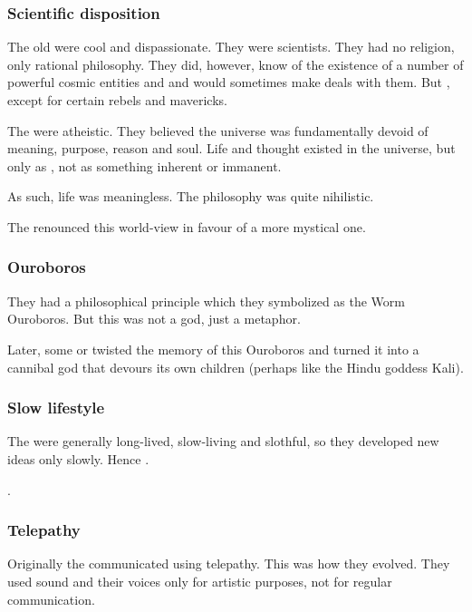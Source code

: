 \subsubsection{Scientific disposition}
The old \ophidians{} were cool and dispassionate. 
They were scientists. 
They had no religion, only rational philosophy. 
They did, however, know of the existence of a number of powerful cosmic entities and  and would sometimes make deals with them. 
But , except for certain rebels and mavericks. 

The \ophidians were atheistic. 
They believed the universe was fundamentally devoid of meaning, purpose, reason and soul.
Life and thought existed in the universe, but only as , not as something inherent or immanent. 

As such, life was meaningless. 
The \ophidian philosophy was quite nihilistic. 

The  renounced this world-view in favour of a more mystical one.





\subsubsection{Ouroboros}
They had a philosophical principle which they symbolized as the Worm Ouroboros. 
But this was not a god, just a metaphor. 

Later, some  \ophidians or \quiljaaran twisted the memory of this Ouroboros and turned it into a cannibal god that devours its own children (perhaps like the Hindu goddess Kali). 





\subsubsection{Slow lifestyle}
The \ophidians were generally long-lived, slow-living and slothful, so they developed new ideas only slowly. 
Hence .

\Sethicus {}. 





\subsubsection{Telepathy}
Originally the \ophidians{} communicated using telepathy. 
This was how they evolved. 
They used sound and their voices only for artistic purposes, not for regular communication. 

